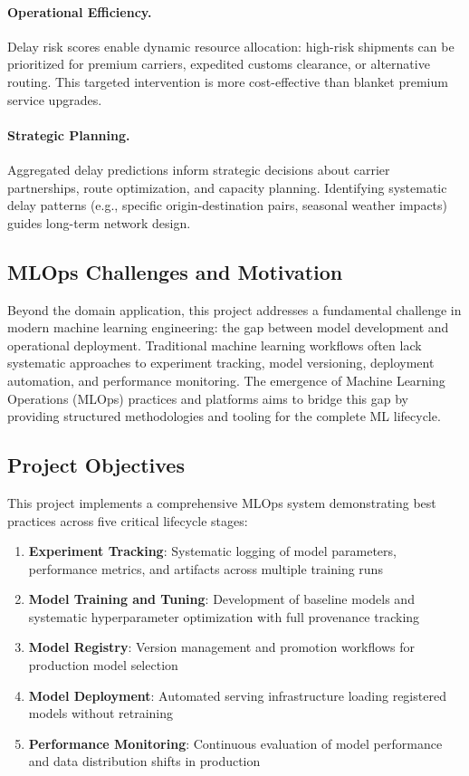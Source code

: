 \documentclass[11pt,a4paper]{article}
\begin{document}
\paragraph{Operational Efficiency.}
Delay risk scores enable dynamic resource allocation: high-risk shipments can be prioritized for premium carriers, expedited customs clearance, or alternative routing. This targeted intervention is more cost-effective than blanket premium service upgrades.

\paragraph{Strategic Planning.}
Aggregated delay predictions inform strategic decisions about carrier partnerships, route optimization, and capacity planning. Identifying systematic delay patterns (e.g., specific origin-destination pairs, seasonal weather impacts) guides long-term network design.

\subsection{MLOps Challenges and Motivation}

Beyond the domain application, this project addresses a fundamental challenge in modern machine learning engineering: the gap between model development and operational deployment. Traditional machine learning workflows often lack systematic approaches to experiment tracking, model versioning, deployment automation, and performance monitoring. The emergence of Machine Learning Operations (MLOps) practices and platforms aims to bridge this gap by providing structured methodologies and tooling for the complete ML lifecycle.

\subsection{Project Objectives}

This project implements a comprehensive MLOps system demonstrating best practices across five critical lifecycle stages:

\begin{enumerate}
    \item \textbf{Experiment Tracking}: Systematic logging of model parameters, performance metrics, and artifacts across multiple training runs
    \item \textbf{Model Training and Tuning}: Development of baseline models and systematic hyperparameter optimization with full provenance tracking
    \item \textbf{Model Registry}: Version management and promotion workflows for production model selection
    \item \textbf{Model Deployment}: Automated serving infrastructure loading registered models without retraining
    \item \textbf{Performance Monitoring}: Continuous evaluation of model performance and data distribution shifts in production
\end{enumerate}
\end{document}
